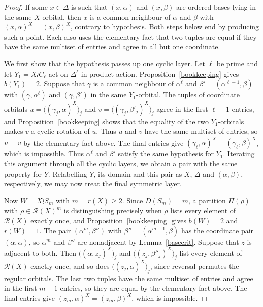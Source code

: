 \documentclass[a4paper,reqno,11pt]{amsart}
\numberwithin{equation}{section}
\begin{document}
\begin{proof}
If some $x\in\Delta$ is such that $(x,\alpha)$ and $(x,\beta)$ are ordered bases lying in the same $X$-orbital, then $x$ is a common neighbour of $\alpha$ and $\beta$ with $(x,\alpha)^X=(x,\beta)^X$, contrary to hypothesis. Both steps below end by producing such a point. Each also uses the elementary fact that two tuples are equal if they have the same multiset of entries and agree in all but one coordinate.

We first show that the hypothesis passes up one cyclic layer. Let $\ell$ be prime and let $Y_1=X\wr C_\ell$ act on $\Delta^\ell$ in product action. Proposition~\ref{bookkeeping} gives $b(Y_1)=2$. Suppose that $\gamma$ is a common neighbour of $\alpha^\ell$ and $\beta'=(\alpha^{\ell-1},\beta)$ with $(\gamma,\alpha^\ell)$ and $(\gamma,\beta')$ in the same $Y_1$-orbital. The tuples of coordinate orbitals $u=\bigl((\gamma_j,\alpha)^X\bigr)_j$ and $v=\bigl((\gamma_j,\beta'_j)^X\bigr)_j$ agree in the first $\ell-1$ entries, and Proposition~\ref{bookkeeping} shows that the equality of the two $Y_1$-orbitals makes $v$ a cyclic rotation of $u$. Thus $u$ and $v$ have the same multiset of entries, so $u=v$ by the elementary fact above. The final entries give $(\gamma_\ell,\alpha)^X=(\gamma_\ell,\beta)^X$, which is impossible. Thus $\alpha^\ell$ and $\beta'$ satisfy the same hypothesis for $Y_1$. Iterating this argument through all the cyclic layers, we obtain a pair with the same property for $Y$. Relabelling $Y$, its domain and this pair as $X$, $\Delta$ and $(\alpha,\beta)$, respectively, we may now treat the final symmetric layer.

Now $W=X\wr S_m$ with $m=r(X)\ge2$. Since $D(S_m)=m$, a partition $\Pi(\rho)$ with $\rho\in\mathcal R(X)^m$ is distinguishing precisely when $\rho$ lists every element of $\mathcal R(X)$ exactly once, and Proposition~\ref{bookkeeping} gives $b(W)=2$ and $r(W)=1$. The pair $(\alpha^m,\beta'')$ with $\beta''=(\alpha^{m-1},\beta)$ has the coordinate pair $(\alpha,\alpha)$, so $\alpha^m$ and $\beta''$ are nonadjacent by Lemma~\ref{basecrit}. Suppose that $z$ is adjacent to both. Then $\bigl((\alpha,z_j)^X\bigr)_j$ and $\bigl((z_j,\beta''_j)^X\bigr)_j$ list every element of $\mathcal R(X)$ exactly once, and so does $\bigl((z_j,\alpha)^X\bigr)_j$, since reversal permutes the regular orbitals. The last two tuples have the same multiset of entries and agree in the first $m-1$ entries, so they are equal by the elementary fact above. The final entries give $(z_m,\alpha)^X=(z_m,\beta)^X$, which is impossible.
\end{proof}
\end{document}
